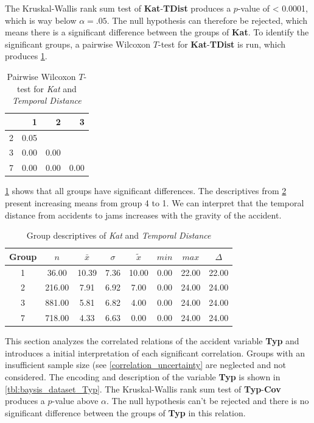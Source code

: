 The Kruskal-Wallis rank sum test of \textbf{Kat}-\textbf{TDist} produces a $p$-value of < 0.0001, which is way below $\alpha=.05$. The null hypothesis can therefore be rejected, which means there is a significant difference between the groups of \textbf{Kat}. To identify the significant groups, a pairwise Wilcoxon $T$-test for \textbf{Kat}-\textbf{TDist} is run, which produces \cref{tbl:wilcoxon_baysis_matched_Kat_TDist}. 
\begin{table}[ht]
	\tiny
	\centering
	\begin{tabular}{rrrr}
		\toprule
		& 1 & 2 & 3 \\ 
		\midrule
		2 & 0.05 &  &  \\ 
		3 & 0.00 & 0.00 &  \\ 
		7 & 0.00 & 0.00 & 0.00 \\ 
		\bottomrule
	\end{tabular}
	\caption{Pairwise Wilcoxon $T$-test for \textit{Kat} and \textit{Temporal Distance}}
	\label{tbl:wilcoxon_baysis_matched_Kat_TDist}
\end{table}
\cref{tbl:wilcoxon_baysis_matched_Kat_TDist} shows that all groups have significant differences. The descriptives from \cref{tbl:descriptives_baysis_matched_Kat_TDist} present increasing means from group 4 to 1. We can interpret that the temporal distance from accidents to jams increases with the gravity of the accident.
\begin{table}[ht]
	\tiny
	\centering
	\begin{tabular}{c|c|c|c|c|c|c|c}
	  	\toprule
		Group & $n$ & $\bar{x}$ & $\sigma$ & $\tilde{x}$ & $min$ & $max$ & $\Delta$ \\ 
	  	\midrule
		1 & 36.00 & 10.39 & 7.36 & 10.00 & 0.00 & 22.00 & 22.00 \\ 
	  	2 & 216.00 & 7.91 & 6.92 & 7.00 & 0.00 & 24.00 & 24.00 \\ 
	  	3 & 881.00 & 5.81 & 6.82 & 4.00 & 0.00 & 24.00 & 24.00 \\ 
	  	7 & 718.00 & 4.33 & 6.63 & 0.00 & 0.00 & 24.00 & 24.00 \\ 
	   	\bottomrule
	\end{tabular}
	\caption{Group descriptives of \textit{Kat} and \textit{Temporal Distance}}
	\label{tbl:descriptives_baysis_matched_Kat_TDist}
\end{table}

This section analyzes the correlated relations of the accident variable \textbf{Typ} and introduces a initial interpretation of each significant correlation. Groups with an insufficient sample size (see \cref{correlation_uncertainty} are neglected and not considered. The encoding and description of the variable \textbf{Typ} is shown in \cref{tbl:baysis_dataset_Typ}. The Kruskal-Wallis rank sum test of \textbf{Typ}-\textbf{Cov} produces a $p$-value above $\alpha$. The null hypothesis can't be rejected and there is no significant difference between the groups of \textbf{Typ} in this relation.

